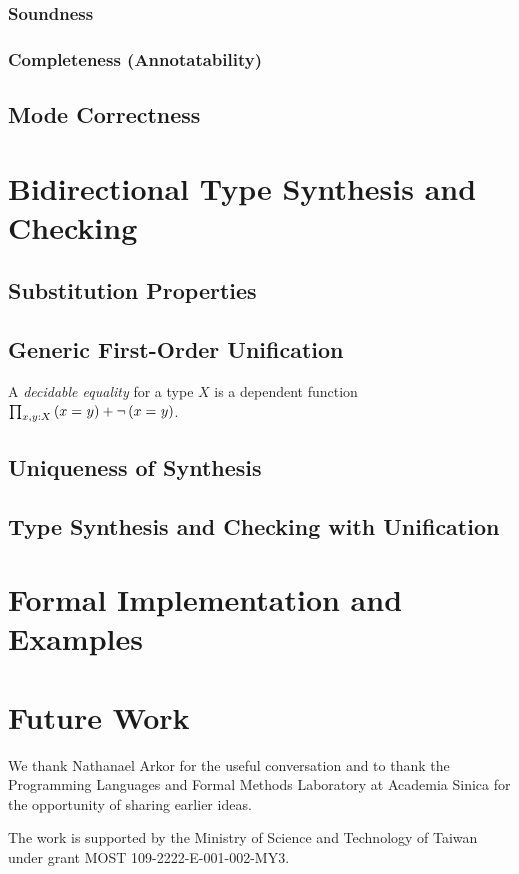 \documentclass[acmsmall]{acmart}
\theoremstyle{acmdefinition}
\begin{document}
\subsubsection{Soundness}
\subsubsection{Completeness (Annotatability)}
\subsection{Mode Correctness}

\section{Bidirectional Type Synthesis and Checking}

\subsection{Substitution Properties}
\subsection{Generic First-Order Unification}
\cite{McBride2003,McBride2003a}
\begin{definition}
A \emph{decidable equality} for a type $X$ is a dependent function $\prod_{x, y : X} \left(x =_{} y\right) + \neg \left(x =_{} y\right)$.
\end{definition}
 
\subsection{Uniqueness of Synthesis}

\subsection{Type Synthesis and Checking with Unification}

\section{Formal Implementation and Examples}

\citep{Xie2018}

\section{Future Work}
\begin{acks}
We thank Nathanael Arkor for the useful conversation and to thank the Programming Languages and Formal Methods Laboratory at Academia Sinica for the opportunity of sharing earlier ideas.

The work is supported by the Ministry of Science and Technology of Taiwan under grant MOST 109-2222-E-001-002-MY3.
\end{acks}



\end{document}
